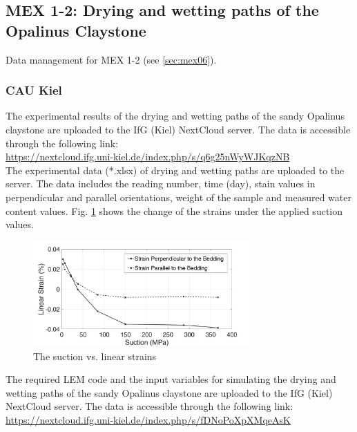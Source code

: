 \subsection{MEX 1-2: Drying and wetting paths of the Opalinus Claystone}

Data management for MEX 1-2 (see \ref{sec:mex06}).

\subsubsection*{CAU Kiel}

The experimental results of the drying and wetting paths of the sandy Opalinus claystone are uploaded to the IfG (Kiel) NextCloud server. The data is accessible through the following link:\\
\hyperlink{https://nextcloud.ifg.uni-kiel.de/index.php/s/q6g25nWyWJKqzNB}{https://nextcloud.ifg.uni-kiel.de/index.php/s/q6g25nWyWJKqzNB}\\

The experimental data (*.xlsx) of drying and wetting paths are uploaded to the server. The data includes the reading number, time (day), stain values in perpendicular and parallel orientations, weight of the sample and measured water content values. Fig. \ref{fig:Amir_ME6_Strain_Data} shows the change of the strains under the applied suction values.

\begin{figure}[!ht]
\centering
\includegraphics[width=0.75\textwidth]{figures/Amir_ME6_Strain_Data.png}
\caption{The suction vs. linear strains}
\label{fig:Amir_ME6_Strain_Data}
\end{figure}

The required LEM code and the input variables for simulating the drying and wetting paths of the sandy Opalinus claystone are uploaded to the IfG (Kiel) NextCloud server. The data is accessible through the following link:\\
\hyperlink{https://nextcloud.ifg.uni-kiel.de/index.php/s/fDNoPoXpXMqeAsK}{https://nextcloud.ifg.uni-kiel.de/index.php/s/fDNoPoXpXMqeAsK}\\

